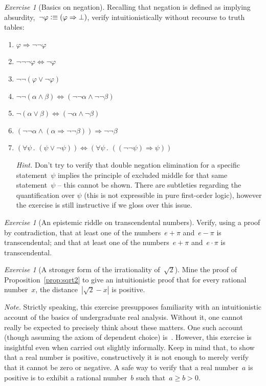 \documentclass[10pt,reqno,a4paper,openany]{amsbook}
\theoremstyle{definition}
\theoremstyle{plain}
\theoremstyle{remark}
\newcommand{\?}{\,{:}\,}
\renewcommand{\_}{\mathpunct{.}\,}
\newcommand{\defequiv}{\vcentcolon\equiv}
\newtheorem{exercise}[defn]{Exercise}
\begin{document}
\begin{exercise}[Basics on negation]
Recalling that negation is defined as implying absurdity,~$\neg\varphi
\defequiv (\varphi \Rightarrow \bot)$, verify intuitionistically without
recourse to truth tables:
\begin{enumerate}
\item $\varphi \Rightarrow \neg\neg\varphi$
\item $\neg\neg\neg\varphi \Leftrightarrow \neg\varphi$
\item $\neg\neg(\varphi \vee \neg\varphi)$
\item $\neg\neg(\alpha \wedge \beta) \Leftrightarrow (\neg\neg\alpha \wedge
\neg\neg\beta)$
\item $\neg(\alpha \vee \beta) \Longleftrightarrow (\neg\alpha \wedge \neg\beta)$
\item $(\neg\neg\alpha \wedge (\alpha \Rightarrow \neg\neg\beta)) \Longrightarrow
\neg\neg\beta$
\item $(\forall\psi\_ (\psi \vee \neg\psi))
\Longleftrightarrow (\forall\psi\_ ((\neg\neg\psi) \Rightarrow
\psi))$

{\noindent\scriptsize\emph{Hint.}
Don't try to verify that double negation elimination for a specific
statement~$\psi$ implies the principle of excluded middle for that same
statement~$\psi$ -- this cannot be shown. There are subtleties regarding the
quantification over $\psi$ (this is not expressible in pure first-order logic),
however the exercise is still instructive if we gloss over this issue.\par}
\end{enumerate}
\end{exercise}

\begin{exercise}[An epistemic riddle on transcendental numbers]
Verify, using a proof by contradiction, that at least one of the numbers~$e +
\pi$ and~$e - \pi$ is transcendental; and that at least one of the
numbers~$e + \pi$ and~$e \cdot \pi$ is transcendental.
\end{exercise}

\begin{exercise}[A stronger form of the irrationality of~$\sqrt{2}$]
\label{ex:sqrt2}
Mine the proof of Proposition~\ref{prop:sqrt2} to give an intuitionistic proof
that for every rational number~$x$, the distance~$|\sqrt{2}-x|$ is positive.

{\noindent\scriptsize\emph{Note.} Strictly speaking, this exercise presupposes
familiarity with an intuitionistic account of the basics of undergraduate real
analysis. Without it, one cannot really be expected to precisely think about
these matters. One such account (though assuming the axiom of dependent choice)
is~\cite{bishop-bridges:bible}. However, this exercise is insightful even when carried out
slightly informally. Keep in mind that, to show that a real number is positive,
constructively it is not enough to merely verify that it cannot be zero or
negative. A safe way to verify that a real number~$a$ is positive is to exhibit
a rational number~$b$ such that~$a \geq b > 0$.\par}
\end{exercise}
\end{document}
